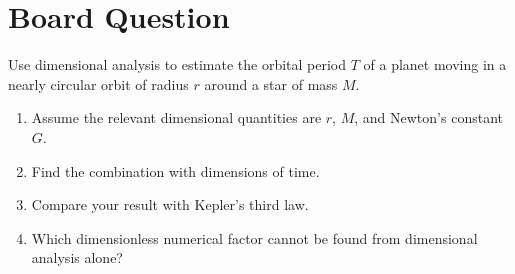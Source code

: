 \documentclass[12pt]{article}
\newif\ifshowboardanswers
\newcommand{\boardanswer}[1]{\ifshowboardanswers\\[0.35em]\textcolor{blue}{\textbf{Answer.} #1}\fi}
\begin{document}
\section*{Board Question}
\begin{tcolorbox}[colback=blue!5!white]
Use dimensional analysis to estimate the orbital period $T$ of a planet moving in a nearly circular orbit of radius $r$ around a star of mass $M$.
\begin{enumerate}
    \item Assume the relevant dimensional quantities are $r$, $M$, and Newton's constant $G$.
    \boardanswer{Use $[r]=L$, $[M]=M$, and $[G]=L^3M^{-1}T^{-2}$.}
    \item Find the combination with dimensions of time.
    \boardanswer{The only combination with dimensions of time is $T\propto\sqrt{r^3/(GM)}$.}
    \item Compare your result with Kepler's third law.
    \boardanswer{This gives $T^2\propto r^3/(GM)$, which is the scaling of Kepler's third law for circular orbits.}
    \item Which dimensionless numerical factor cannot be found from dimensional analysis alone?
    \boardanswer{Dimensional analysis cannot determine the factor $2\pi$ in $T=2\pi\sqrt{r^3/(GM)}$.}
\end{enumerate}
\end{tcolorbox}
\fi
\end{document}
